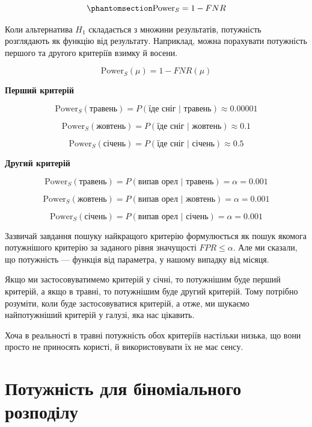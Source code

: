 \documentclass[
  letterpaper,
  10pt,
  openany]{report}
\theoremstyle{definition}
\theoremstyle{remark}
\begin{document}
\begin{equation}\phantomsection\label{eq-power}{
\text{Power}_S = 1 - FNR
}\end{equation}

Коли альтернатива \(H_1\) складається з множини результатів, потужність
розглядають як функцію від результату. Наприклад, можна порахувати
потужність першого та другого критеріїв взимку й восени.

\[
\text{Power}_S(\mu) = 1 - FNR(\mu)
\]

\textbf{Перший критерій}

\[
\text{Power}_S(\text{травень}) = P(\text{їде сніг } | \text{ травень}) \approx 0.00001
\]

\[
\text{Power}_S(\text{жовтень}) = P(\text{їде сніг } | \text{ жовтень}) \approx 0.1
\]

\[
\text{Power}_S(\text{січень}) = P(\text{їде сніг } | \text{ січень}) \approx 0.5
\]

\textbf{Другий критерій}

\[
\text{Power}_S(\text{травень}) = P(\text{випав орел } | \text{ травень}) = \alpha = 0.001
\]

\[
\text{Power}_S(\text{жовтень}) = P(\text{випав орел } | \text{ жовтень}) = \alpha = 0.001
\]

\[
\text{Power}_S(\text{січень}) = P(\text{випав орел } | \text{ січень}) = \alpha = 0.001
\]

Зазвичай завдання пошуку найкращого критерію формулюється як пошук
якомога потужнішого критерію за заданого рівня значущості
\(FPR \leqslant \alpha\). Але ми сказали, що потужність --- функція від
параметра, у нашому випадку від місяця.

Якщо ми застосовуватимемо критерій у січні, то потужнішим буде перший
критерій, а якщо в травні, то потужнішим буде другий критерій. Тому
потрібно розуміти, коли буде застосовуватися критерій, а отже, ми
шукаємо найпотужніший критерій у галузі, яка нас цікавить.

Хоча в реальності в травні потужність обох критеріїв настільки низька,
що вони просто не приносять користі, й використовувати їх не має сенсу.

\section{Потужність для біноміального
розподілу}\label{ux43fux43eux442ux443ux436ux43dux456ux441ux442ux44c-ux434ux43bux44f-ux431ux456ux43dux43eux43cux456ux430ux43bux44cux43dux43eux433ux43e-ux440ux43eux437ux43fux43eux434ux456ux43bux443}
\end{document}
